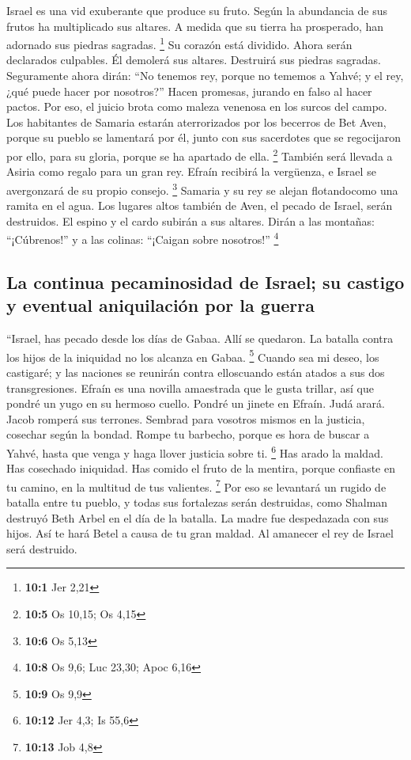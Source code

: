  Israel es una vid exuberante que produce su fruto. Según
la abundancia de sus frutos ha multiplicado sus altares. A medida que su
tierra ha prosperado, han adornado sus piedras sagradas. \footnote{\textbf{10:1}
  Jer 2,21}  Su corazón está dividido. Ahora serán
declarados culpables. Él demolerá sus altares. Destruirá sus piedras
sagradas.  Seguramente ahora dirán: ``No tenemos rey,
porque no tememos a Yahvé; y el rey, ¿qué puede hacer por nosotros?''
 Hacen promesas, jurando en falso al hacer pactos. Por
eso, el juicio brota como maleza venenosa en los surcos del campo.
 Los habitantes de Samaria estarán aterrorizados por los
becerros de Bet Aven, porque su pueblo se lamentará por él, junto con
sus sacerdotes que se regocijaron por ello, para su gloria, porque se ha
apartado de ella. \footnote{\textbf{10:5} Os 10,15; Os 4,15}
 También será llevada a Asiria como regalo para un gran
rey. Efraín recibirá la vergüenza, e Israel se avergonzará de su propio
consejo. \footnote{\textbf{10:6} Os 5,13}  Samaria y su
rey se alejan flotandocomo una ramita en el agua.  Los
lugares altos también de Aven, el pecado de Israel, serán destruidos. El
espino y el cardo subirán a sus altares. Dirán a las montañas:
``¡Cúbrenos!'' y a las colinas: ``¡Caigan sobre nosotros!'' \footnote{\textbf{10:8}
  Os 9,6; Luc 23,30; Apoc 6,16}

\hypertarget{la-continua-pecaminosidad-de-israel-su-castigo-y-eventual-aniquilaciuxf3n-por-la-guerra}{%
\subsection{La continua pecaminosidad de Israel; su castigo y eventual
aniquilación por la
guerra}\label{la-continua-pecaminosidad-de-israel-su-castigo-y-eventual-aniquilaciuxf3n-por-la-guerra}}

 ``Israel, has pecado desde los días de Gabaa. Allí se
quedaron. La batalla contra los hijos de la iniquidad no los alcanza en
Gabaa. \footnote{\textbf{10:9} Os 9,9}  Cuando sea mi
deseo, los castigaré; y las naciones se reunirán contra elloscuando
están atados a sus dos transgresiones.  Efraín es una
novilla amaestrada que le gusta trillar, así que pondré un yugo en su
hermoso cuello. Pondré un jinete en Efraín. Judá arará. Jacob romperá
sus terrones.  Sembrad para vosotros mismos en la
justicia, cosechar según la bondad. Rompe tu barbecho, porque es hora de
buscar a Yahvé, hasta que venga y haga llover justicia sobre ti.
\footnote{\textbf{10:12} Jer 4,3; Is 55,6}  Has arado la
maldad. Has cosechado iniquidad. Has comido el fruto de la mentira,
porque confiaste en tu camino, en la multitud de tus valientes.
\footnote{\textbf{10:13} Job 4,8}  Por eso se levantará
un rugido de batalla entre tu pueblo, y todas sus fortalezas serán
destruidas, como Shalman destruyó Beth Arbel en el día de la batalla. La
madre fue despedazada con sus hijos.  Así te hará Betel a
causa de tu gran maldad. Al amanecer el rey de Israel será destruido.


